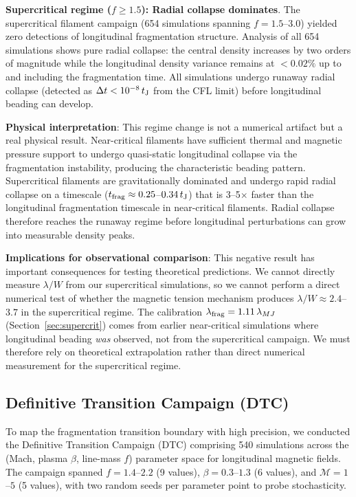 \documentclass[twoside,twocolumn]{mnras}
\begin{document}
\textbf{Supercritical regime ($f \geq 1.5$): Radial collapse dominates}. The supercritical filament campaign (654 simulations spanning $f = 1.5$--$3.0$) yielded zero detections of longitudinal fragmentation structure. Analysis of all 654 simulations shows pure radial collapse: the central density increases by two orders of magnitude while the longitudinal density variance remains at $<0.02\%$ up to and including the fragmentation time. All simulations undergo runaway radial collapse (detected as $\Delta t < 10^{-8}\,t_{\rm J}$ from the CFL limit) before longitudinal beading can develop.

\textbf{Physical interpretation}: This regime change is not a numerical artifact but a real physical result. Near-critical filaments have sufficient thermal and magnetic pressure support to undergo quasi-static longitudinal collapse via the fragmentation instability, producing the characteristic beading pattern. Supercritical filaments are gravitationally dominated and undergo rapid radial collapse on a timescale ($t_{\rm frag} \approx 0.25$--$0.34\,t_{\rm J}$) that is 3--5$\times$ faster than the longitudinal fragmentation timescale in near-critical filaments. Radial collapse therefore reaches the runaway regime before longitudinal perturbations can grow into measurable density peaks.

\textbf{Implications for observational comparison}: This negative result has important consequences for testing theoretical predictions. We cannot directly measure $\lambda/W$ from our supercritical simulations, so we cannot perform a direct numerical test of whether the magnetic tension mechanism produces $\lambda/W \approx 2.4$--$3.7$ in the supercritical regime. The calibration $\lambda_{\rm frag} = 1.11\,\lambda_{MJ}$ (Section~\ref{sec:supercrit}) comes from earlier near-critical simulations where longitudinal beading \textit{was} observed, not from the supercritical campaign. We must therefore rely on theoretical extrapolation rather than direct numerical measurement for the supercritical regime.

\subsection{Definitive Transition Campaign (DTC)}
\label{sec:dtc}

To map the fragmentation transition boundary with high precision, we conducted the Definitive Transition Campaign (DTC) comprising 540 simulations across the (Mach, plasma $\beta$, line-mass $f$) parameter space for longitudinal magnetic fields. The campaign spanned $f = 1.4$--$2.2$ (9 values), $\beta = 0.3$--$1.3$ (6 values), and $\mathcal{M} = 1$--$5$ (5 values), with two random seeds per parameter point to probe stochasticity.
\end{document}
